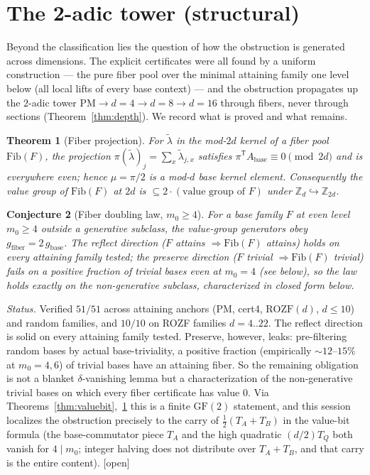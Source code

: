 \documentclass[11pt]{article}
\newtheorem{theorem}{Theorem}
\newtheorem{conjecture}[theorem]{Conjecture}
\theoremstyle{remark}
\newcommand{\Z}{\mathbb{Z}}
\begin{document}
\section{The 2-adic tower (structural)}
Beyond the classification lies the question of how the obstruction is generated across dimensions. The
explicit certificates were all found by a uniform construction --- the pure fiber pool over the
minimal attaining family one level below (all local lifts of every base context) --- and the
obstruction propagates up the $2$-adic tower $\mathrm{PM}\to d{=}4\to d{=}8\to d{=}16$ through fibers,
never through sections (Theorem~\ref{thm:depth}). We record what is proved and what remains.
\begin{theorem}[Fiber projection]\label{thm:fiber}
For $\tilde\lambda$ in the mod-$2d$ kernel of a fiber pool $\mathrm{Fib}(F)$, the projection
$\pi(\tilde\lambda)_j=\sum_x\tilde\lambda_{j,x}$ satisfies $\pi^{\mathsf T}A_{\mathrm{base}}\equiv
0\pmod{2d}$ and is everywhere even; hence $\mu=\pi/2$ is a mod-$d$ base kernel element. Consequently
the value group of $\mathrm{Fib}(F)$ at $2d$ is $\subseteq 2\cdot(\text{value group of }F)$ under
$\Z_d\hookrightarrow\Z_{2d}$.
\end{theorem}
\begin{conjecture}[Fiber doubling law, $m_0\ge 4$]\label{conj:doubling}
For a base family $F$ at even level $m_0\ge 4$ outside a generative subclass, the value-group
generators obey $g_{\mathrm{fiber}}=2\,g_{\mathrm{base}}$. The reflect direction ($F$ attains
$\Rightarrow\mathrm{Fib}(F)$ attains) holds on every attaining family tested; the preserve direction
($F$ trivial $\Rightarrow\mathrm{Fib}(F)$ trivial) fails on a positive fraction of trivial bases even
at $m_0=4$ (see below), so the law holds exactly on the non-generative subclass, characterized in
closed form below.
\end{conjecture}
\noindent\emph{Status.} Verified $51/51$ across attaining anchors (PM, cert4, $\mathrm{ROZF}(d)$,
$d\le 10$) and random families, and $10/10$ on ROZF families $d=4..22$. The reflect direction is solid
on every attaining family tested. Preserve, however, leaks: pre-filtering random bases by actual
base-triviality, a positive fraction (empirically ${\sim}12\text{--}15\%$ at $m_0=4,6$) of trivial
bases have an attaining fiber. So the remaining obligation is not a blanket $\delta$-vanishing lemma
but a characterization of the non-generative trivial bases on which every fiber certificate has value
$0$. Via Theorems~\ref{thm:valuebit},~\ref{thm:fiber} this is a finite $\mathrm{GF}(2)$ statement, and
this session localizes the obstruction precisely to the carry of $\tfrac12(T_A+T_B)$ in the value-bit
formula (the base-commutator piece $T_A$ and the high quadratic $(d/2)T_Q$ both vanish for
$4\mid m_0$; integer halving does not distribute over $T_A+T_B$, and that carry is the entire
content). [open]
\end{document}
